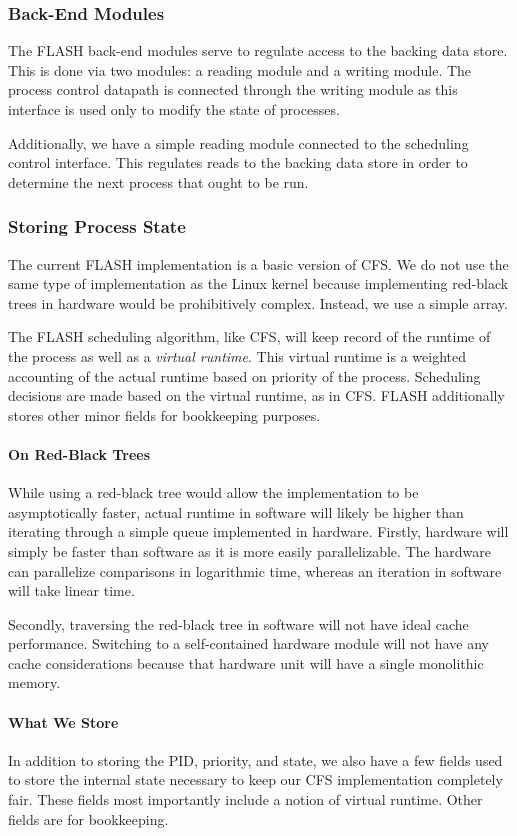 \documentclass{sig-alternate-10pt}
\begin{document}
\subsubsection{Back-End Modules}
The FLASH back-end modules serve to regulate access to the backing data
store.  This is done via two modules: a reading module and a writing module.
The process control datapath is connected through the writing module as this
interface is used only to modify the state of processes.

Additionally, we have a simple reading module connected to the scheduling
control interface.  This regulates reads to the backing data store in order
to determine the next process that ought to be run.

\subsubsection{Storing Process State}
The current FLASH implementation is a basic version of CFS.  We do not use
the same type of implementation as the Linux kernel because implementing
red-black trees in hardware would be prohibitively complex.  Instead, we use
a simple array.

The FLASH scheduling algorithm, like CFS, will keep record of the runtime of
the process as well as a \emph{virtual runtime}.  This virtual runtime is
a weighted accounting of the actual runtime based on priority of the
process.  Scheduling decisions are made based on the virtual runtime, as in
CFS.  FLASH additionally stores other minor fields for bookkeeping purposes.

\paragraph{On Red-Black Trees}
While using a red-black tree would allow the implementation to be
asymptotically faster, actual runtime in software will likely be higher than
iterating through a simple queue implemented in hardware.  Firstly, hardware
will simply be faster than software as it is more easily parallelizable.
The hardware can parallelize comparisons in logarithmic time, whereas an
iteration in software will take linear time.

Secondly, traversing the red-black tree in software will not have ideal cache
performance. Switching to a self-contained hardware module will not have any
cache considerations because that hardware unit will have a single
monolithic memory.

\paragraph{What We Store}
In addition to storing the PID, priority, and state, we also have a few
fields used to store the internal state necessary to keep our CFS implementation
completely fair.  These fields most importantly include a notion of virtual
runtime.  Other fields are for bookkeeping.
\end{document}
